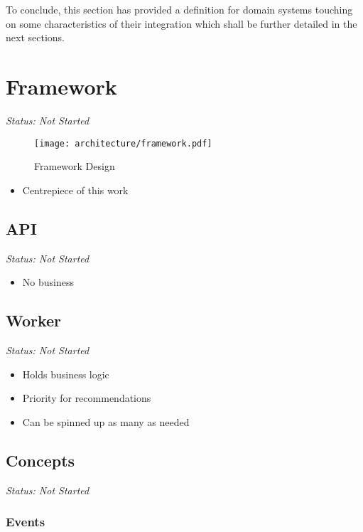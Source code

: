 To conclude, this section has provided a definition for domain systems touching on some characteristics of their integration which shall be further detailed in the next sections.

\section{Framework}

\emph{Status: Not Started}

\begin{figure}[ht]
    \texttt{[image: architecture/framework.pdf]}
    \caption{Framework Design}
    \label{fig:collaborative}
\end{figure}

\begin{itemize}
\item Centrepiece of this work
\end{itemize}

\subsection{API}

\emph{Status: Not Started}

\begin{itemize}
\item No business
\end{itemize}

\subsection{Worker}

\emph{Status: Not Started}

\begin{itemize}
\item Holds business logic
\item Priority for recommendations
\item Can be spinned up as many as needed
\end{itemize}

\subsection{Concepts}

\emph{Status: Not Started}

\subsubsection{Events}

